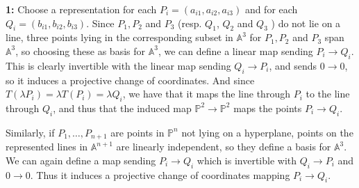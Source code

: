 \documentclass[a4paper]{article}
\begin{document}
    \textbf{1:} Choose a representation for
    each $P_i = (a_{i1}, a_{i2}, a_{i3})$ and
    for each $Q_i = (b_{i 1}, b_{i 2}, b_{i 3})$.
    Since $P_1, P_2$ and $P_3$ (resp. $Q_1$, $Q_2$ and $Q_3$ ) do not lie on
    a line, three points lying in the corresponding subset in $\mathbb{A}^3$ 
    for
    $P_1, P_2$ and $P_3$ span
    $\mathbb{A}^3$, so choosing these as basis for
    $\mathbb{A}^3$, we can define a linear map
    sending $P_i \to Q_i$. This is clearly invertible with
    the linear map sending $Q_i \to P_i$, and
    sends $0 \to 0$, so it induces a projective change
    of coordinates. And since
    $T(\lambda P_i) = \lambda T(P_i) =
    \lambda Q_i$, we have that it maps
    the line through $P_i$ to the line through $Q_i$, and thus
    that the induced map $\mathbb{P}^2 \to \mathbb{P}^2$ maps
    the points $P_i \to Q_i$.\\
    \linebreak

    Similarly, if $P_1, \ldots, P_{n+1}$ are points in 
    $\mathbb{P}^{n}$ not lying on a hyperplane, points on the represented lines
    in
    $\mathbb{A}^{n+1}$ are linearly independent, so
    they define a basis for $\mathbb{A}^3$. We can again define a map
    sending  $P_i \to Q_i$ which is invertible with
    $Q_i \to P_i$ and $0 \to 0$. Thus it induces a projective
    change of coordinates mapping
    $P_i \to Q_i$.\\
\end{document}
